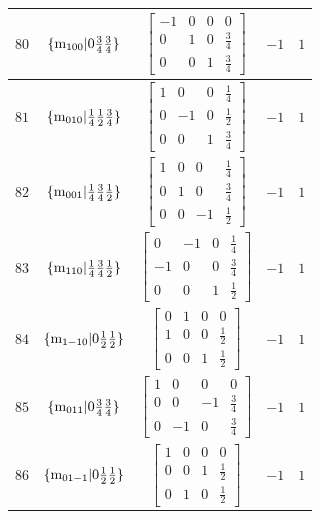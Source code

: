 \documentclass[fleqn,8pt]{jsarticle}
\begin{document}
\begin{longtable}{ccccc}
$ 80 $ & $ \{{\rm m}_{100}|0 \frac{3}{4} \frac{3}{4}\} $ & $ \begin{bmatrix} -1 & 0 & 0 & 0 \\ 0 & 1 & 0 & \frac{3}{4} \\ 0 & 0 & 1 & \frac{3}{4} \end{bmatrix} $ & $ -1 $ & $ 1 $ \\ \hline
$ 81 $ & $ \{{\rm m}_{010}|\frac{1}{4} \frac{1}{2} \frac{3}{4}\} $ & $ \begin{bmatrix} 1 & 0 & 0 & \frac{1}{4} \\ 0 & -1 & 0 & \frac{1}{2} \\ 0 & 0 & 1 & \frac{3}{4} \end{bmatrix} $ & $ -1 $ & $ 1 $ \\ \hline
$ 82 $ & $ \{{\rm m}_{001}|\frac{1}{4} \frac{3}{4} \frac{1}{2}\} $ & $ \begin{bmatrix} 1 & 0 & 0 & \frac{1}{4} \\ 0 & 1 & 0 & \frac{3}{4} \\ 0 & 0 & -1 & \frac{1}{2} \end{bmatrix} $ & $ -1 $ & $ 1 $ \\ \hline
$ 83 $ & $ \{{\rm m}_{110}|\frac{1}{4} \frac{3}{4} \frac{1}{2}\} $ & $ \begin{bmatrix} 0 & -1 & 0 & \frac{1}{4} \\ -1 & 0 & 0 & \frac{3}{4} \\ 0 & 0 & 1 & \frac{1}{2} \end{bmatrix} $ & $ -1 $ & $ 1 $ \\ \hline
$ 84 $ & $ \{{\rm m}_{1-10}|0 \frac{1}{2} \frac{1}{2}\} $ & $ \begin{bmatrix} 0 & 1 & 0 & 0 \\ 1 & 0 & 0 & \frac{1}{2} \\ 0 & 0 & 1 & \frac{1}{2} \end{bmatrix} $ & $ -1 $ & $ 1 $ \\ \hline
$ 85 $ & $ \{{\rm m}_{011}|0 \frac{3}{4} \frac{3}{4}\} $ & $ \begin{bmatrix} 1 & 0 & 0 & 0 \\ 0 & 0 & -1 & \frac{3}{4} \\ 0 & -1 & 0 & \frac{3}{4} \end{bmatrix} $ & $ -1 $ & $ 1 $ \\ \hline
$ 86 $ & $ \{{\rm m}_{01-1}|0 \frac{1}{2} \frac{1}{2}\} $ & $ \begin{bmatrix} 1 & 0 & 0 & 0 \\ 0 & 0 & 1 & \frac{1}{2} \\ 0 & 1 & 0 & \frac{1}{2} \end{bmatrix} $ & $ -1 $ & $ 1 $ \\ \hline

\end{longtable}
\end{document}
